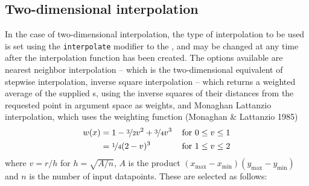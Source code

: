
\subsection{Two-dimensional interpolation}

In the case of two-dimensional interpolation, the type of interpolation to be
used is set using the {\tt interpolate} modifier to the ,
and may be changed at any time after the interpolation function has been
created.  The options available are nearest neighbor interpolation -- which is
the two-dimensional equivalent of stepwise interpolation, inverse square
interpolation -- which returns a weighted average of the supplied \datapoint s,
using the inverse squares of their distances from the requested point in
argument space as weights, and Monaghan Lattanzio interpolation, which uses the
weighting function (Monaghan \& Lattanzio 1985)
\begin{eqnarray*}
w(x) & = 1 - \nicefrac{3}{2}v^2 + \nicefrac{3}{4}v^3 & \,\mathrm{for~}0\leq v\leq 1 \\
     & = \nicefrac{1}{4}(2-v)^3                      & \,\mathrm{for~}1\leq v\leq 2
\end{eqnarray*}
where $v=r/h$ for $h=\sqrt{A/n}$, $A$ is the product
$(x_\mathrm{max}-x_\mathrm{min})(y_\mathrm{max}-y_\mathrm{min})$ and $n$ is the
number of input datapoints. These are selected as follows:


